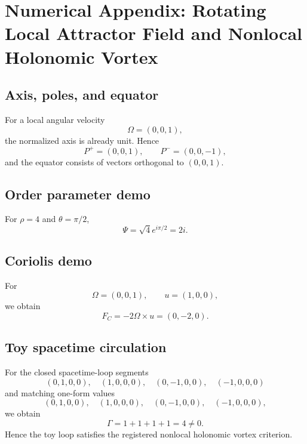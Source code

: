 \appendix
\section{Numerical Appendix: Rotating Local Attractor Field and Nonlocal Holonomic Vortex}
\label{app:rotating-local-attractor-vortex}

\subsection{Axis, poles, and equator}
For a local angular velocity
\begin{equation}
\Omega = (0,0,1),
\end{equation}
the normalized axis is already unit. Hence
\begin{equation}
P^{+}=(0,0,1),\qquad P^{-}=(0,0,-1),
\end{equation}
and the equator consists of vectors orthogonal to $(0,0,1)$.

\subsection{Order parameter demo}
For $\rho=4$ and $\theta=\pi/2$,
\begin{equation}
\Psi = \sqrt{4}e^{i\pi/2}=2i.
\end{equation}

\subsection{Coriolis demo}
For
\begin{equation}
\Omega=(0,0,1),\qquad u=(1,0,0),
\end{equation}
we obtain
\begin{equation}
F_C = -2\Omega\times u = (0,-2,0).
\end{equation}

\subsection{Toy spacetime circulation}
For the closed spacetime-loop segments
\begin{equation}
(0,1,0,0),\quad (1,0,0,0),\quad (0,-1,0,0),\quad (-1,0,0,0)
\end{equation}
and matching one-form values
\begin{equation}
(0,1,0,0),\quad (1,0,0,0),\quad (0,-1,0,0),\quad (-1,0,0,0),
\end{equation}
we obtain
\begin{equation}
\Gamma = 1+1+1+1 = 4 \neq 0.
\end{equation}
Hence the toy loop satisfies the registered nonlocal holonomic vortex criterion.


